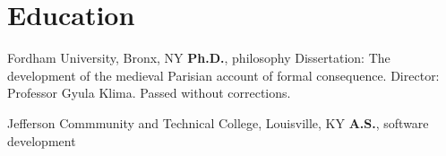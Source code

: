 \vspace*{0.4cm}
\section{Education}
{%
	Fordham University, Bronx, NY}
{%
	\textbf{Ph.D.}, philosophy}
{%
	Dissertation: The development of the medieval Parisian account of formal consequence. Director: Professor Gyula Klima. Passed without corrections.}

{%
	Jefferson Commmunity and Technical College, Louisville, KY}
{%
	\textbf{A.S.}, software development}
{}
